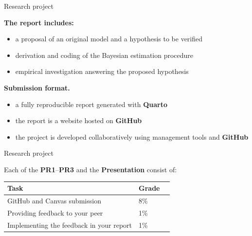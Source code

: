 \documentclass[notes,blackandwhite,mathsans]{beamer}
\begin{document}
\begin{frame}{Research project}

\textbf{The report includes:}
\begin{itemize}
\smallskip\item {\color{mcxs1}a proposal of an original model} {\color{mcxs2}and a hypothesis to be verified}

\item {\color{mcxs1}derivation and coding} {\color{mcxs2}of the Bayesian estimation procedure}

\item {\color{mcxs1}empirical investigation} {\color{mcxs2}answering the proposed hypothesis}
\end{itemize}


\bigskip\textbf{Submission format.}
\begin{itemize}
\smallskip\item {\color{mcxs1}a fully reproducible report} {\color{mcxs2}generated with \textbf{Quarto}}

\smallskip\item {\color{mcxs1}the report is a website} {\color{mcxs2}hosted on \textbf{GitHub}}

\smallskip\item {\color{mcxs1}the project is developed collaboratively} {\color{mcxs2}using management tools  and \textbf{GitHub}}
\end{itemize}


\end{frame}






\begin{frame}{Research project}

\begin{center}
Each of the \textbf{PR1}--\textbf{PR3} and the \textbf{Presentation} consist of:

\bigskip
\begin{tabular}{ l l l }
\toprule 
Task & Grade \\
\midrule
GitHub and Canvas submission & 8\% \\[1ex]
Providing feedback to your peer & 1\% \\[1ex]
Implementing the feedback in your report & 1\% \\[1ex]
\bottomrule
\end{tabular}

\end{center}

\end{frame}
\end{document}
